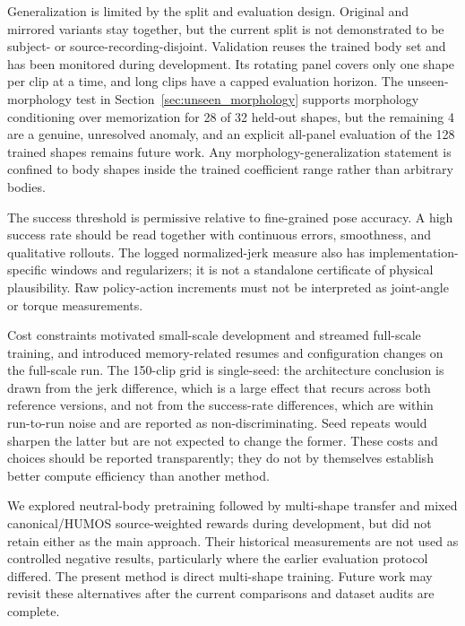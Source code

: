 Generalization is limited by the split and evaluation design. Original and
mirrored variants stay together, but the current split is not demonstrated
to be subject- or source-recording-disjoint. Validation reuses the trained
body set and has been monitored during development. Its rotating panel
covers only one shape per clip at a time, and long clips have a capped
evaluation horizon. The unseen-morphology test in
Section~\ref{sec:unseen_morphology} supports morphology conditioning over
memorization for 28 of 32 held-out shapes, but the remaining 4 are a
genuine, unresolved anomaly, and an explicit all-panel evaluation of the 128
trained shapes remains future work. Any morphology-generalization statement
is confined to body shapes inside the trained coefficient range rather than
arbitrary bodies.

The success threshold is permissive relative to fine-grained pose accuracy.
A high success rate should be read together with continuous errors,
smoothness, and qualitative rollouts. The logged normalized-jerk measure
also has implementation-specific windows and regularizers; it is not a
standalone certificate of physical plausibility. Raw policy-action
increments must not be interpreted as joint-angle or torque measurements.

Cost constraints motivated small-scale development and streamed full-scale
training, and introduced memory-related resumes and configuration changes on
the full-scale run. The 150-clip grid is single-seed: the architecture
conclusion is drawn from the jerk difference, which is a large effect that
recurs across both reference versions, and not from the success-rate
differences, which are within run-to-run noise and are reported as
non-discriminating. Seed repeats would sharpen the latter but are not
expected to change the former. These costs and choices should be reported
transparently; they do not by themselves establish better compute efficiency
than another method.

We explored neutral-body pretraining followed by multi-shape transfer and
mixed canonical/HUMOS source-weighted rewards during development, but did
not retain either as the main approach. Their historical measurements are
not used as controlled negative results, particularly where the earlier
evaluation protocol differed. The present method is direct multi-shape
training. Future work may revisit these alternatives after the current
comparisons and dataset audits are complete.
